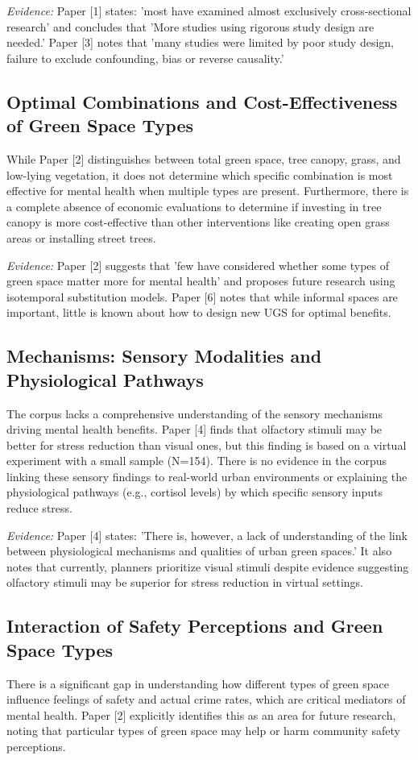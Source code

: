 \documentclass[11pt]{article}
\begin{document}
\textit{Evidence:} Paper [1] states: 'most have examined almost exclusively cross-sectional research' and concludes that 'More studies using rigorous study design are needed.' Paper [3] notes that 'many studies were limited by poor study design, failure to exclude confounding, bias or reverse causality.'

\subsection{Optimal Combinations and Cost-Effectiveness of Green Space Types}
While Paper [2] distinguishes between total green space, tree canopy, grass, and low-lying vegetation, it does not determine which specific combination is most effective for mental health when multiple types are present. Furthermore, there is a complete absence of economic evaluations to determine if investing in tree canopy is more cost-effective than other interventions like creating open grass areas or installing street trees.

\textit{Evidence:} Paper [2] suggests that 'few have considered whether some types of green space matter more for mental health' and proposes future research using isotemporal substitution models. Paper [6] notes that while informal spaces are important, little is known about how to design new UGS for optimal benefits.

\subsection{Mechanisms: Sensory Modalities and Physiological Pathways}
The corpus lacks a comprehensive understanding of the sensory mechanisms driving mental health benefits. Paper [4] finds that olfactory stimuli may be better for stress reduction than visual ones, but this finding is based on a virtual experiment with a small sample (N=154). There is no evidence in the corpus linking these sensory findings to real-world urban environments or explaining the physiological pathways (e.g., cortisol levels) by which specific sensory inputs reduce stress.

\textit{Evidence:} Paper [4] states: 'There is, however, a lack of understanding of the link between physiological mechanisms and qualities of urban green spaces.' It also notes that currently, planners prioritize visual stimuli despite evidence suggesting olfactory stimuli may be superior for stress reduction in virtual settings.

\subsection{Interaction of Safety Perceptions and Green Space Types}
There is a significant gap in understanding how different types of green space influence feelings of safety and actual crime rates, which are critical mediators of mental health. Paper [2] explicitly identifies this as an area for future research, noting that particular types of green space may help or harm community safety perceptions.
\end{document}
